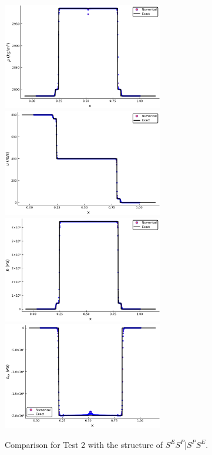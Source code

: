\documentclass[review]{elsarticle}
\numberwithin{equation}{section}
\numberwithin{table}{section}
\begin{document}
\begin{figure}[ht]
  \centering
  \includegraphics[width= 7cm] {case2rho.pdf}
  \includegraphics[width= 7cm] {case2u.pdf}
  \includegraphics[width= 7cm] {case2p.pdf}
  \includegraphics[width= 7cm] {case2sxx.pdf}
  \caption{Comparison for Test 2 with the structure of $S^ES^P|S^PS^E$.  }
  \label{fig:case2}
\end{figure}
\end{document}
